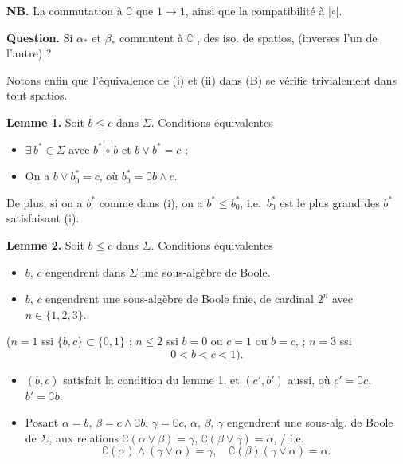 \documentclass[11pt,a4paper]{article}
\begin{document}
\textbf{NB.} La commutation à $\complement$   que $1 \to 1$, ainsi que la compatibilité à $\mathbin{|\circ|}$.

\textbf{Question.} Si $\alpha_*$ et $\beta_*$ commutent à $\complement$ \add{(\ill{})},  des iso. de spatios, (inverses l'un de l'autre) ?

Notons enfin que l'équivalence de (i) et (ii) dans (B) se vérifie trivialement dans tout spatios.

\textbf{Lemme 1.} Soit $b \le c$ dans $\Sigma$. Conditions équivalentes
\begin{itemize}
  \item[(i)] $\exists\, b^* \in \Sigma$ avec $b^* \mathbin{|\circ|} b$ et $b \vee b^* = c$ ;
  \item[(ii)] On a $b \vee b^*_0 = c$, où $b^*_0 = \complement b \wedge c$.
\end{itemize}
De plus, si on a $b^*$ comme dans (i), on a $b^* \le b^*_0$, i.e.\ $b^*_0$ est le plus grand des $b^*$ satisfaisant (i).

\textbf{Lemme 2.} Soit $b \le c$ dans $\Sigma$. Conditions équivalentes
\begin{itemize}
  \item[(i)] $b$, $c$ engendrent dans $\Sigma$  une sous-algèbre de Boole.
  \item[(ii)] $b$, $c$ engendrent une sous-algèbre de Boole finie, de cardinal $2^n$ avec $n \in \{1,2,3\}$.
\end{itemize}
 ($n = 1$ ssi $\{b,c\} \subset \{0,1\}$ ; $n \le 2$ ssi $b = 0$ ou $c = 1$ ou $b = c$,  ; $n = 3$ ssi 
\[
  0 < b < c < 1 \bigr) .
\]
\begin{itemize}
  \item[(iii)] $(b, c)$ satisfait la condition du lemme 1, et $(c', b')$ aussi, où $c' = \complement c$, $b' = \complement b$.
  \item[(iv)] Posant $\alpha = b$, $\beta = c \wedge \complement b$, $\gamma = \complement c$,  $\alpha$, $\beta$, $\gamma$ engendrent une sous-alg. de Boole \ill{} \ill{} de $\Sigma$,  aux relations $\complement(\alpha \vee \beta) = \gamma$, $\complement(\beta \vee \gamma) = \alpha$, \add{$\complement(\gamma \vee \alpha) = \beta$} / i.e.\
  \[
    \complement(\alpha) \wedge (\gamma \vee \alpha) = \gamma, \quad
    \complement(\beta)(\gamma \vee \alpha) = \alpha .
  \]
\end{itemize}
\marginal{\uncertain{dont} $\alpha, \beta, \gamma$ \uncertain{mut.} disjoints}
\end{document}
